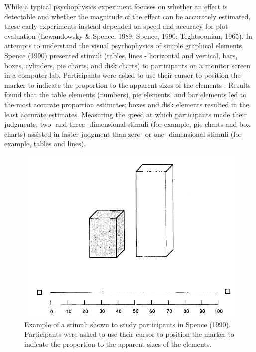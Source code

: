 \documentclass[print]{nuthesis}
\begin{document}
While a typical psychophysics experiment focuses on whether an effect is detectable and whether the magnitude of the effect can be accurately estimated, these early experiments instead depended on speed and accuracy for plot evaluation (Lewandowsky \& Spence, 1989; Spence, 1990; Teghtsoonian, 1965).
In attempts to understand the visual psychophysics of simple graphical elements, Spence (1990) presented stimuli (tables, lines - horizontal and vertical, bars, boxes, cylinders, pie charts, and disk charts) to participants on a monitor screen in a computer lab.
Participants were asked to use their cursor to position the marker to indicate the proportion to the apparent sizes of the elements .
Results found that the table elements (numbers), pie elements, and bar elements led to the most accurate proportion estimates; boxes and disk elements resulted in the least accurate estimates.
Measuring the speed at which participants made their judgments, two- and three- dimensional stimuli (for example, pie charts and box charts) assisted in faster judgment than zero- or one- dimensional stimuli (for example, tables and lines).

\begin{figure}[tbp]

{\centering \includegraphics[width=0.75\linewidth,]{images/spence-1990-proportion} 

}

\caption[Spence (1990) task display]{Example of a stimuli shown to study participants in Spence (1990). Participants were asked to use their cursor to position the marker to indicate the proportion to the apparent sizes of the elements.}\label{fig:spence-1990-proportion}
\end{figure}
\end{document}
